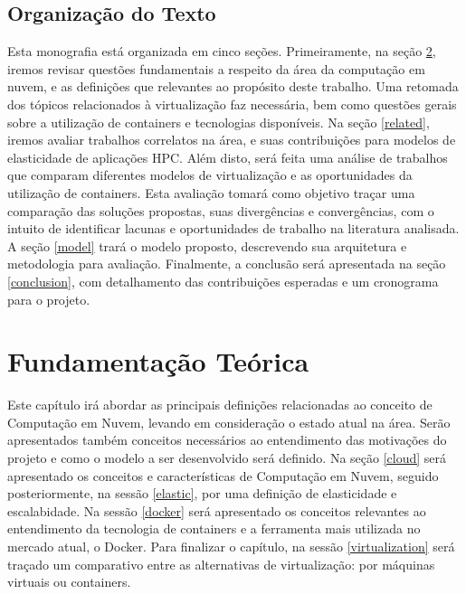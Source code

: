 \documentclass[twoside,english,brazilian]{UNISINOSmonografia}
\begin{document}
\section{Organização do Texto}

Esta monografia está organizada em cinco seções. Primeiramente, na seção \ref{fundamentacao}, iremos revisar questões fundamentais a respeito da área da computação em nuvem, e as definições que relevantes ao propósito deste trabalho. Uma retomada dos tópicos relacionados à virtualização faz necessária, bem como questões gerais sobre a utilização de containers e tecnologias disponíveis. Na seção \ref{related}, iremos avaliar trabalhos correlatos na área, e suas contribuições para modelos de elasticidade de aplicações HPC. Além disto, será feita uma análise de trabalhos que comparam diferentes modelos de virtualização e as oportunidades da utilização de containers. Esta avaliação tomará como objetivo traçar uma comparação das soluções propostas, suas divergências e convergências, com o intuito de identificar lacunas e oportunidades
de trabalho na literatura analisada. A seção \ref{model} trará o modelo proposto, descrevendo sua arquitetura e metodologia para avaliação. Finalmente, a conclusão será apresentada na seção \ref{conclusion}, com detalhamento das contribuições esperadas e
um cronograma para o projeto.


\chapter{Fundamentação Teórica}
\label{fundamentacao}

Este capítulo irá abordar as principais definições relacionadas ao conceito de Computação em Nuvem, levando em consideração o estado atual na área. Serão apresentados também conceitos necessários ao entendimento das motivações do projeto e como o modelo a ser desenvolvido será definido. Na seção \ref{cloud} será apresentado os conceitos e características de Computação em Nuvem, seguido posteriormente, na sessão \ref{elastic}, por uma definição de elasticidade e escalabidade. Na sessão \ref{docker} será apresentado os conceitos relevantes ao entendimento da tecnologia de containers e a ferramenta mais utilizada no mercado atual, o Docker. Para finalizar o capítulo, na sessão \ref{virtualization} será traçado um comparativo entre as alternativas de virtualização: por máquinas virtuais ou containers. 
\end{document}
